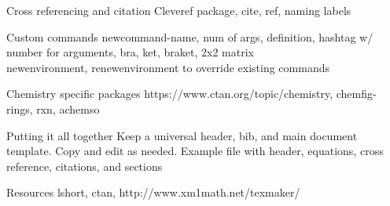 \documentclass[11pt]{beamer}
\begin{document}
%
%
\begin{frame}{Cross referencing and citation}
Cleveref package, cite, ref, naming labels
\end{frame}

%
%
\begin{frame}{Custom commands}
newcommand-name, num of args, definition, hashtag w/ number for arguments, bra, ket, braket, 2x2 matrix \\
newenvironment, renewenvironment to override existing commands
\end{frame}

%
%
\begin{frame}{Chemistry specific packages}
https://www.ctan.org/topic/chemistry, chemfig-rings, rxn, achemso
\end{frame}

%
%
\begin{frame}{Putting it all together}
Keep a universal header, bib, and main document template. Copy and edit as needed. Example file with header, equations, cross reference, citations, and sections
\end{frame}

%
%
\begin{frame}{Resources}
lshort, ctan, http://www.xm1math.net/texmaker/
\end{frame}
\end{document}

